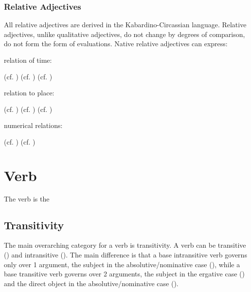 \documentclass[a4paper, 10pt]{book}
\begin{document}
\subsection{Relative Adjectives}
All relative adjectives are derived in the Kabardino-Circassian language.
Relative adjectives, unlike qualitative adjectives, do not change by degrees of comparison, do not form the form of evaluations.
Native relative adjectives can express:
\begin{exe}
\ex
\begin{xlist}
    \ex relation of time:
    \begin{xlist}
        \ex {} (cf. )
        \ex {} (cf. )
        \ex {} (cf. )
        \ex {}
        \ex {}
    \end{xlist}
    \ex relation to place:
    \begin{xlist}
        \ex {} (cf. )
        \ex {} (cf. )
        \ex {}
        \ex {} (cf. )
    \end{xlist}
    \ex numerical relations:
    \begin{xlist}
        \ex {} (cf. )
        \ex {} (cf. )
    \end{xlist}
\end{xlist}
\end{exe}

\chapter{Verb}
The verb is the 
\section{Transitivity}
The main overarching category for a verb is transitivity. A verb can be transitive () and intransitive (). The main difference is that a base intransitive verb governs only over 1 argument, the subject in the absolutive/nominative case (), while a base transitive verb governs over 2 arguments, the subject in the ergative case () and the direct object in the absolutive/nominative case ().
\end{document}
